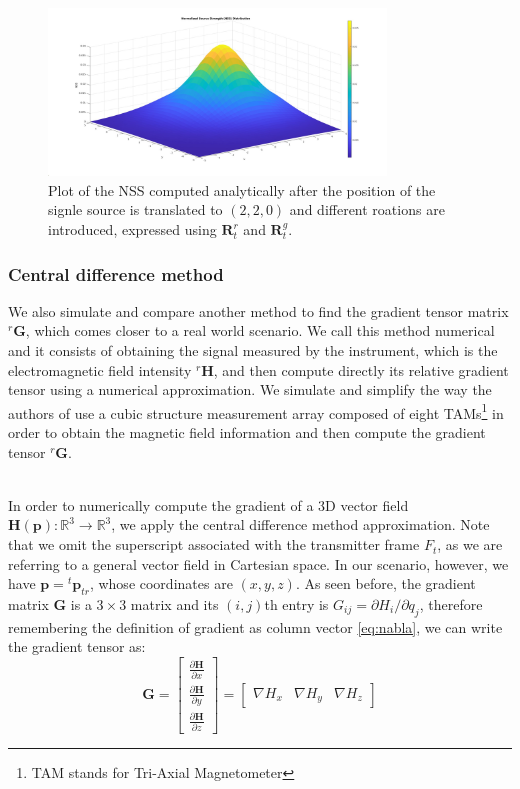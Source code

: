 \begin{figure}
    \centering
    \includegraphics[width=0.8\textwidth]{images/NSS_rotated_single_anal.jpg}
    \caption{Plot of the NSS computed analytically after the position of the signle source is translated to $(2,2,0)$ and 
    different roations are introduced, expressed using $\mathbf{R}^r_t$ and $\mathbf{R}_t^g$.}
    \label{fig:NSS_rotated_single_anal}
\end{figure}

\subsubsection{Central difference method}
We also simulate and compare another method to find the gradient tensor matrix
${}^r \mathbf{G}$, which comes closer to a real world scenario.
We call this method numerical and it consists of obtaining the 
signal measured by the instrument, which is the electromagnetic field intensity
${}^r \mathbf{H}$, and then compute directly its relative gradient tensor using a 
numerical approximation.
We simulate and simplify the way the authors of \cite{NSS_single_localization} use 
a cubic structure measurement array composed of eight
TAMs\footnote{TAM stands for Tri-Axial Magnetometer} in order to obtain the magnetic
field information and then compute the gradient tensor ${}^r \mathbf{G}$.

\noindent
\\
In order to numerically compute the gradient of a 3D vector field $ \mathbf{H}( \mathbf{p}): \mathbb{R}^3 \to \mathbb{R}^3$,
we apply the central difference method approximation.
Note that we omit the superscript associated with the transmitter frame \( F_t \), 
as we are referring to a general vector field in Cartesian space. In our scenario, however, 
we have \( \mathbf{p} = {}^t \mathbf{p}_{tr} \), whose coordinates are \( (x, y, z) \).
As seen before, the gradient matrix $ \mathbf{G}$ is a \(3 \times 3\) matrix
and its $(i,j)$th entry is $G_{ij} = \partial H_i / \partial q_j$, therefore
remembering the definition of gradient as column vector \ref{eq:nabla}, we can write the gradient tensor as:
\begin{equation}
 \mathbf{G} =
\begin{bmatrix}
\frac{\partial \mathbf{H}}{\partial x} \\
\frac{\partial \mathbf{H}}{\partial y} \\
\frac{\partial \mathbf{H}}{\partial z}
\end{bmatrix}
=
\begin{bmatrix}
    \nabla H_x &
    \nabla H_y &
    \nabla H_z
\end{bmatrix}
\end{equation}

